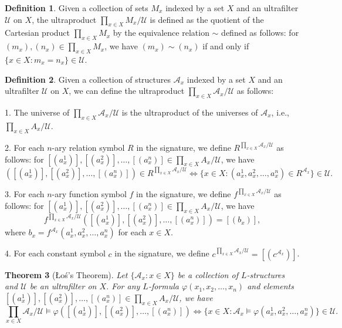\documentclass[12pt, reqno]{amsart}
\newtheorem{theorem}{Theorem}[section]
\theoremstyle{definition}
\newtheorem{definition}[theorem]{Definition}
\theoremstyle{remark}
\numberwithin{equation}{section}
\begin{document}
{\begin{definition}
    Given a collection of sets $M_x$ indexed by a set $X$ and an ultrafilter $\mathcal{U}$ on $X$, the ultraproduct $\prod_{x \in X} M_x/ \mathcal{U}$ is defined as the quotient of the Cartesian product $\prod_{x \in X} M_x$ by the equivalence relation $\sim$ defined as follows: for $(m_x), (n_x) \in \prod_{x \in X} M_x$, we have $(m_x) \sim (n_x)$ if and only if $\{x \in X : m_x = n_x\} \in \mathcal{U}$.
\end{definition}



\begin{definition}
    Given a collection of structures $\mathcal{A}_x$ indexed by a set $X$ and an ultrafilter $\mathcal{U}$ on $X$, we can define the ultraproduct $\prod_{x \in X} \mathcal{A}_x/ \mathcal{U}$ as follows:

    1. The universe of $\prod_{x \in X} \mathcal{A}_x/ \mathcal{U}$ is the ultraproduct of the universes of $\mathcal{A}_x$, i.e., $\prod_{x \in X} A_x/ \mathcal{U}$.

    2. For each $n$-ary relation symbol $R$ in the signature, we define $R^{\prod_{x \in X} \mathcal{A}_x/ \mathcal{U}}$ as follows: for $[(a_x^1)], [(a_x^2)], \ldots, [(a_x^n)] \in \prod_{x \in X} A_x/ \mathcal{U}$, we have
    \[
        ([(a_x^1)], [(a_x^2)], \ldots, [(a_x^n)]) \in R^{\prod_{x \in X} \mathcal{A}_x/ \mathcal{U}} \iff \{x \in X : (a_x^1, a_x^2, \ldots, a_x^n) \in R^{\mathcal{A}_x}\} \in \mathcal{U}.
    \]

    3. For each $n$-ary function symbol $f$ in the signature, we define $f^{\prod_{x \in X} \mathcal{A}_x/ \mathcal{U}}$ as follows: for $[(a_x^1)], [(a_x^2)], \ldots, [(a_x^n)] \in \prod_{x \in X} A_x/ \mathcal{U}$, we have
    \[
        f^{\prod_{x \in X} \mathcal{A}_x/ \mathcal{U}}([(a_x^1)], [(a_x^2)], \ldots, [(a_x^n)]) = [(b_x)],
    \]
    where $b_x = f^{\mathcal{A}_x}(a_x^1, a_x^2, \ldots, a_x^n)$ for each $x \in X$.

    4. For each constant symbol $c$ in the signature, we define $c^{\prod_{x \in X} \mathcal{A}_x/ \mathcal{U}} = [(c^{\mathcal{A}_x})]$.
\end{definition}

\begin{theorem}[Łoś's Theorem]
    Let $\{\mathcal{A}_x : x \in X\}$ be a collection of $L$-structures and $\mathcal{U}$ be an ultrafilter on $X$. For any $L$-formula $\varphi(x_1, x_2, \ldots, x_n)$ and elements $[(a_x^1)], [(a_x^2)], \ldots, [(a_x^n)] \in \prod_{x \in X} A_x/ \mathcal{U}$, we have
    \[
        \prod_{x \in X} \mathcal{A}_x/ \mathcal{U} \models \varphi([(a_x^1)], [(a_x^2)], \ldots, [(a_x^n)]) \iff \{x \in X : \mathcal{A}_x \models \varphi(a_x^1, a_x^2, \ldots, a_x^n)\} \in \mathcal{U}.
    \]


\end{theorem}}
\end{document}
